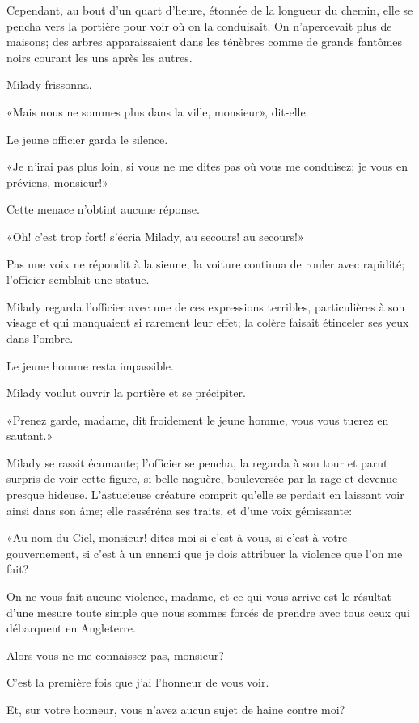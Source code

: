Cependant, au bout d'un quart d'heure, étonnée de la longueur du chemin, elle se pencha vers la portière pour voir où on la conduisait. On n'apercevait plus de maisons; des arbres apparaissaient dans les ténèbres comme de grands fantômes noirs courant les uns après les autres. 

Milady frissonna. 

«Mais nous ne sommes plus dans la ville, monsieur», dit-elle. 

Le jeune officier garda le silence. 

«Je n'irai pas plus loin, si vous ne me dites pas où vous me conduisez; je vous en préviens, monsieur!» 

Cette menace n'obtint aucune réponse. 

«Oh! c'est trop fort! s'écria Milady, au secours! au secours!» 

Pas une voix ne répondit à la sienne, la voiture continua de rouler avec rapidité; l'officier semblait une statue. 

Milady regarda l'officier avec une de ces expressions terribles, particulières à son visage et qui manquaient si rarement leur effet; la colère faisait étinceler ses yeux dans l'ombre. 

Le jeune homme resta impassible. 

Milady voulut ouvrir la portière et se précipiter. 

«Prenez garde, madame, dit froidement le jeune homme, vous vous tuerez en sautant.» 

Milady se rassit écumante; l'officier se pencha, la regarda à son tour et parut surpris de voir cette figure, si belle naguère, bouleversée par la rage et devenue presque hideuse. L'astucieuse créature comprit qu'elle se perdait en laissant voir ainsi dans son âme; elle rasséréna ses traits, et d'une voix gémissante: 

«Au nom du Ciel, monsieur! dites-moi si c'est à vous, si c'est à votre gouvernement, si c'est à un ennemi que je dois attribuer la violence que l'on me fait? 

\speak  On ne vous fait aucune violence, madame, et ce qui vous arrive est le résultat d'une mesure toute simple que nous sommes forcés de prendre avec tous ceux qui débarquent en Angleterre. 

\speak  Alors vous ne me connaissez pas, monsieur? 

\speak  C'est la première fois que j'ai l'honneur de vous voir. 

\speak  Et, sur votre honneur, vous n'avez aucun sujet de haine contre moi? 

